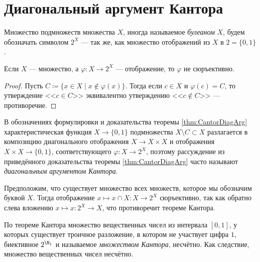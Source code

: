 \documentclass[
	extrafontsizes,
	11pt,
	hyphens,
]{memoir}
\begin{document}
\section{Диагональный аргумент Кантора}

\begin{notation}
Множество подмножеств множества \(X\), иногда называемое \emph{булеаном} \(X\), будем обозначать символом \(2^X\) --- так же, как множество отображений из \(X\) в \(2 = \{0,1\}\).
\end{notation}

\begin{theorem}
\label{thm:CantorDiagArg}
Если \(X\) --- множество, а \(\varphi : X \to 2^X\) --- отображение, то \(\varphi\) не сюръективно.
\end{theorem}

\begin{proof}
Пусть
\(C \coloneqq \{x \in X \mid x \notin \varphi(x)\}\).
Тогда если \(c \in X\) и \(\varphi(c) = C\),
то утверждение <<\(c \in C\)>> эквивалентно утверждению <<\(c \notin C\)>> --- противоречие.
\end{proof}

\begin{remark}
В обозначениях формулировки и доказательства теоремы \ref{thm:CantorDiagArg} характеристическая функция \(X \to \{0,1\}\) подмножества \(X \setminus C  \subset X\) разлагается в композицию диагонального отображения \(X \to X \times X\) и отображения \(X \times X \to \{0,1\}\), соответствующего \(\varphi : X \to 2^X\),
поэтому рассуждение из приведённого доказательства теоремы \ref{thm:CantorDiagArg} часто называют \emph{диагональным аргументом Кантора}.
\end{remark}

\begin{observation}
Предположим, что существует множество всех множеств, которое мы обозначим буквой \(X\).
Тогда отображение \(x \mapsto x \cap X : X \to 2^X\) сюръективно, так как обратно слева вложению \(x \mapsto x : 2^X \to X\), что противоречит теореме Кантора.
\end{observation}

\begin{observation}
По теореме Кантора множество вещественных чисел из интервала \([0,1]\), у которых существует троичное разложение, в котором не участвует цифра \(1\), биективное \(2^{\N_1}\) и называемое \emph{множеством Кантора}, несчётно. Как следствие, множество вещественных чисел несчётно.
\end{observation}
\end{document}
